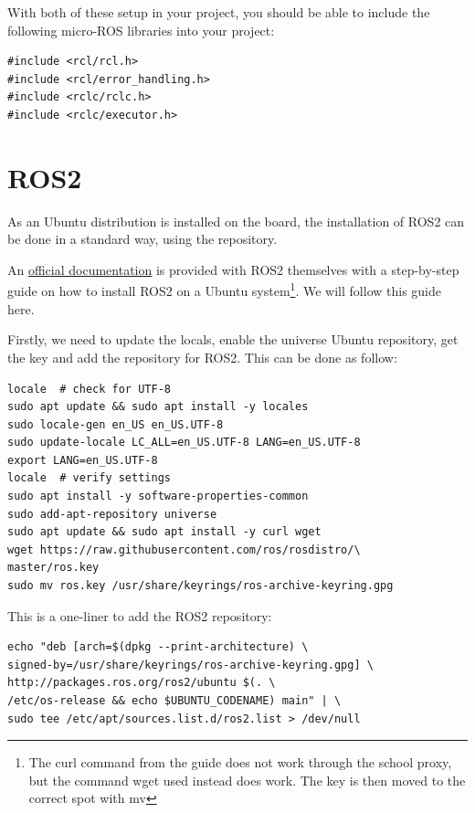 \documentclass[10pt]{article}
\begin{document}
With both of these setup in your project, you should be able to include the following micro-ROS libraries into your project:
\begin{tcolorbox}
\begin{verbatim}
#include <rcl/rcl.h>
#include <rcl/error_handling.h>
#include <rclc/rclc.h>
#include <rclc/executor.h>
\end{verbatim}
\end{tcolorbox}


\pagebreak
\section{ROS2}
\label{sec:ros2}
As an Ubuntu distribution is installed on the board, the installation of ROS2 can be done
in a standard way, using the repository.

An \href{https://docs.ros.org/en/humble/Installation/Ubuntu-Install-Debians.html}{official documentation}
is provided with ROS2 themselves with a step-by-step guide on how to install
ROS2 on a Ubuntu system\footnote{The curl command from the guide does not work through the school proxy,
  but the command wget used instead does work. The key is then moved to the correct spot with mv}.
We will follow this guide here.

Firstly, we need to update the locals,  enable the universe Ubuntu repository, get the key and add the repository for ROS2. This can be done as follow:

\begin{tcolorbox}
\begin{verbatim}
locale  # check for UTF-8
sudo apt update && sudo apt install -y locales
sudo locale-gen en_US en_US.UTF-8
sudo update-locale LC_ALL=en_US.UTF-8 LANG=en_US.UTF-8
export LANG=en_US.UTF-8
locale  # verify settings
sudo apt install -y software-properties-common
sudo add-apt-repository universe
sudo apt update && sudo apt install -y curl wget
wget https://raw.githubusercontent.com/ros/rosdistro/\
master/ros.key
sudo mv ros.key /usr/share/keyrings/ros-archive-keyring.gpg
\end{verbatim}
\end{tcolorbox}


This is a one-liner to add the ROS2 repository:

\begin{tcolorbox}
\begin{verbatim}
echo "deb [arch=$(dpkg --print-architecture) \
signed-by=/usr/share/keyrings/ros-archive-keyring.gpg] \
http://packages.ros.org/ros2/ubuntu $(. \
/etc/os-release && echo $UBUNTU_CODENAME) main" | \
sudo tee /etc/apt/sources.list.d/ros2.list > /dev/null
\end{verbatim}
\end{tcolorbox}
\end{document}
